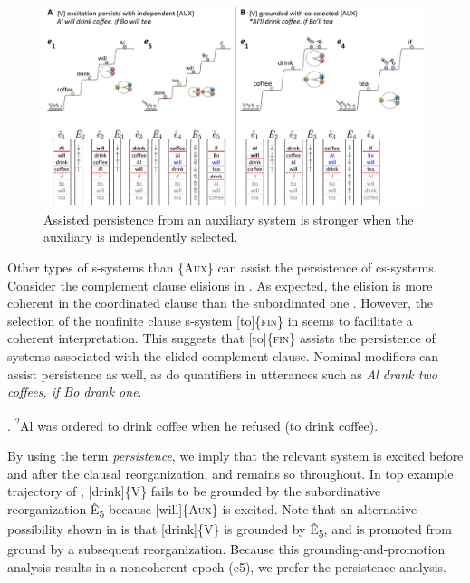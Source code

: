  
\begin{figure}
\includegraphics[width=\textwidth]{figures/Tilsen-img148.png}
\caption{Assisted persistence from an auxiliary system is stronger when the auxiliary is independently selected.}
\label{fig:7:4}
\end{figure}
 

  Other types of s-systems than \{A\textsc{ux}\} can assist the persistence of cs-systems. Consider the complement clause elisions in . As expected, the elision is more coherent in the coordinated clause  than the subordinated one . However, the selection of the nonfinite clause s-system [to]\{\textsc{fin}\} in  seems to facilitate a coherent interpretation. This suggests that [to]\{\textsc{fin}\} assists the persistence of systems associated with the elided complement clause. Nominal modifiers can assist persistence as well, as do quantifiers in utterances such as \textit{Al drank two coffees, if Bo drank one}.

\ea\label{ex:7:6}
.\label{ex:7:6a}
\ex\textsuperscript{?}{Al was ordered to drink coffee when he refused (to drink coffee)}.\label{ex:7:6b}
\label{ex:7:6c}
\z
\z

  By using the term \textit{persistence}, we imply that the relevant system is excited before and after the clausal reorganization, and remains so throughout. In top example trajectory of {}, [drink]\{V\} fails to be grounded by the subordinative reorganization Ê\textsubscript{5} because [will]\{A\textsc{ux}\} is excited. Note that an alternative possibility shown in {} is that [drink]\{V\} is grounded by Ê\textsubscript{5},\textsubscript{} and is promoted from ground by a subsequent reorganization. Because this grounding-and-promotion analysis results in a noncoherent epoch (e5), we prefer the persistence analysis.

